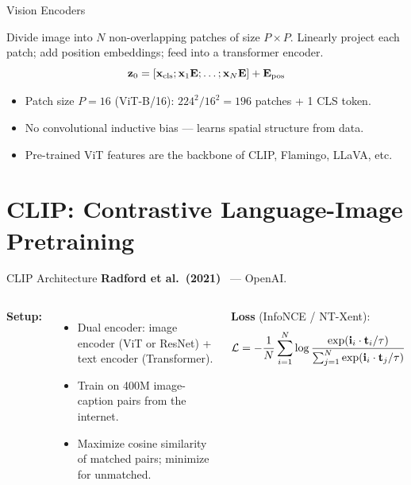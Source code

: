 \documentclass[aspectratio=169,10pt]{beamer}
\begin{document}
\begin{frame}{Vision Encoders}
  \begin{tcolorbox}[hitbox, title=Vision Transformer (ViT)]
    Divide image into $N$ non-overlapping patches of size $P \times P$.
    Linearly project each patch; add position embeddings; feed into a transformer encoder.
    \[
      \mathbf{z}_0 = [\mathbf{x}_\text{cls}; \mathbf{x}_1 \mathbf{E}; \ldots; \mathbf{x}_N \mathbf{E}] + \mathbf{E}_\text{pos}
    \]
  \end{tcolorbox}
  \vspace{0.4em}
  \begin{itemize}
    \item Patch size $P=16$ (ViT-B/16): $224^2 / 16^2 = 196$ patches + 1 CLS token.
    \item No convolutional inductive bias — learns spatial structure from data.
    \item Pre-trained ViT features are the backbone of CLIP, Flamingo, LLaVA, etc.
  \end{itemize}
\end{frame}

\section{CLIP: Contrastive Language-Image Pretraining}

\begin{frame}{CLIP Architecture}
  \textbf{Radford et al.\ (2021)}~\cite{radford2021learning} — OpenAI.
  \vspace{0.4em}
  \begin{columns}[T]
      \textbf{Setup:}
      \begin{itemize}
        \item Dual encoder: image encoder (ViT or ResNet) + text encoder (Transformer).
        \item Train on 400M image-caption pairs from the internet.
        \item Maximize cosine similarity of matched pairs; minimize for unmatched.
      \end{itemize}
      \vspace{0.4em}
      \textbf{Loss} (InfoNCE / NT-Xent):
      \[
        \mathcal{L} = -\frac{1}{N}\sum_{i=1}^N \log
        \frac{\exp(\mathbf{i}_i \cdot \mathbf{t}_i / \tau)}
             {\sum_{j=1}^N \exp(\mathbf{i}_i \cdot \mathbf{t}_j / \tau)}
      \]
  \end{columns}
\end{frame}
\end{document}
